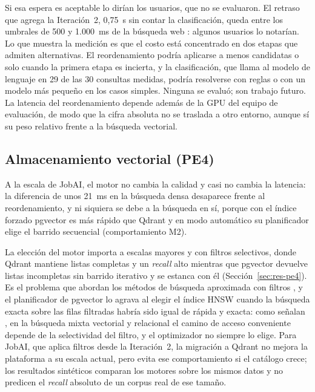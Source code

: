 Si esa espera es aceptable lo dirían los usuarios, que no se evaluaron. El retraso que agrega la Iteración~2, 0,75~s sin contar la clasificación, queda entre los umbrales de 500 y 1.000~ms de la búsqueda web \citep{Bai2017}: algunos usuarios lo notarían. Lo que muestra la medición es que el costo está concentrado en dos etapas que admiten alternativas. El reordenamiento podría aplicarse a menos candidatas o solo cuando la primera etapa es incierta, y la clasificación, que llama al modelo de lenguaje en 29 de las 30 consultas medidas, podría resolverse con reglas o con un modelo más pequeño en los casos simples. Ninguna se evaluó; son trabajo futuro. La latencia del reordenamiento depende además de la GPU del equipo de evaluación, de modo que la cifra absoluta no se traslada a otro entorno, aunque sí su peso relativo frente a la búsqueda vectorial.

\subsection{Almacenamiento vectorial (PE4)}

A la escala de JobAI, el motor no cambia la calidad y casi no cambia la latencia: la diferencia de unos 21~ms en la búsqueda densa desaparece frente al reordenamiento, y ni siquiera se debe a la búsqueda en sí, porque con el índice forzado pgvector es más rápido que Qdrant y en modo automático su planificador elige el barrido secuencial (comportamiento M2).

La elección del motor importa a escalas mayores y con filtros selectivos, donde Qdrant mantiene listas completas y un \textit{recall} alto mientras que pgvector devuelve listas incompletas sin barrido iterativo y se estanca con él (Sección~\ref{sec:res-pe4}). Es el problema que abordan los métodos de búsqueda aproximada con filtros \citep{Gollapudi2023, Patel2024}, y el planificador de pgvector lo agrava al elegir el índice HNSW cuando la búsqueda exacta sobre las filas filtradas habría sido igual de rápida y exacta: como señalan \citet{Sanca2024}, en la búsqueda mixta vectorial y relacional el camino de acceso conveniente depende de la selectividad del filtro, y el optimizador no siempre lo elige. Para JobAI, que aplica filtros desde la Iteración~2, la migración a Qdrant no mejora la plataforma a su escala actual, pero evita ese comportamiento si el catálogo crece; los resultados sintéticos comparan los motores sobre los mismos datos y no predicen el \textit{recall} absoluto de un corpus real de ese tamaño.

